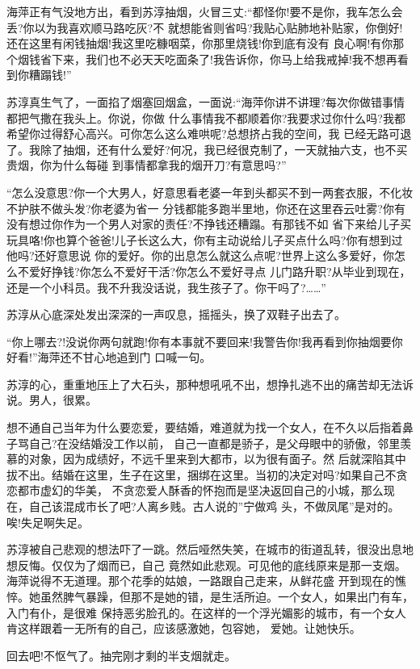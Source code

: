\documentclass[11pt,a4paper,onecolumn]{article}
\begin{document}
海萍正有气没地方出，看到苏淳抽烟，火冒三丈:``都怪你!要不是你，我车怎么会丢?你以为我喜欢顺马路吃灰?不
就想能省则省吗?我贴心贴肺地补贴家，你倒好!还在这里有闲钱抽烟!我这里吃糠咽菜，你那里烧钱!你到底有没有
良心啊!有你那个烟钱省下来，我们也不必天天吃面条了!我告诉你，你马上给我戒掉!我不想再看到你糟蹋钱!''

苏淳真生气了，一面掐了烟塞回烟盒，一面说:``海萍你讲不讲理?每次你做错事情都把气撒在我头上。你说，你做
什么事情我不都顺着你?我要求过你什么吗?我都希望你过得舒心高兴。可你怎么这么难哄呢?总想挤占我的空间，我
已经无路可退了。我除了抽烟，还有什么爱好?何况，我已经很克制了，一天就抽六支，也不买贵烟，你为什么每碰
到事情都拿我的烟开刀?有意思吗?''

``怎么没意思?你一个大男人，好意思看老婆一年到头都买不到一两套衣服，不化妆不护肤不做头发?你老婆为省一
分钱都能多跑半里地，你还在这里吞云吐雾?你有没有想过你作为一个男人对家的责任?不挣钱还糟蹋。有那钱不如
省下来给儿子买玩具咯!你也算个爸爸!儿子长这么大，你有主动说给儿子买点什么吗?你有想到过他吗?还好意思说
你的爱好。你的出息怎么就这么点呢?世界上这么多爱好，你怎么不爱好挣钱?你怎么不爱好干活?你怎么不爱好寻点
儿门路升职?从毕业到现在，还是一个小科员。我不升我没话说，我生孩子了。你干吗了?……''

苏淳从心底深处发出深深的一声叹息，摇摇头，换了双鞋子出去了。

``你上哪去?!没说你两句就跑!你有本事就不要回来!我警告你!我再看到你抽烟要你好看!''海萍还不甘心地追到门
口喊一句。

苏淳的心，重重地压上了大石头，那种想吼吼不出，想挣扎逃不出的痛苦却无法诉说。男人，很累。

想不通自己当年为什么要恋爱，要结婚，难道就为找一个女人，在不久以后指着鼻子骂自己?在没结婚没工作以前，
自己一直都是骄子，是父母眼中的骄傲，邻里羡慕的对象，因为成绩好，不远千里来到大都市，以为很有面子。然
后就深陷其中拔不出。结婚在这里，生子在这里，捆绑在这里。当初的决定对吗?如果自己不贪恋都市虚幻的华美，
不贪恋爱人酥香的怀抱而是坚决返回自己的小城，那么现在，自己该混成市长了吧?人离乡贱。古人说的''宁做鸡
头，不做凤尾''是对的。唉!失足啊失足。

苏淳被自己悲观的想法吓了一跳。然后哑然失笑，在城市的街道乱转，很没出息地想反悔。仅仅为了烟而已，自己
竟然如此悲观。可见他的底线原来是那一支烟。海萍说得不无道理。那个花季的姑娘，一路跟自己走来，从鲜花盛
开到现在的憔悴。她虽然脾气暴躁，但那不是她的错，是生活所迫。一个女人，如果出门有车，入门有仆，是很难
保持恶劣脸孔的。在这样的一个浮光媚影的城市，有一个女人肯这样跟着一无所有的自己，应该感激她，包容她，
爱她。让她快乐。

回去吧!不怄气了。抽完刚才剩的半支烟就走。
\end{document}
